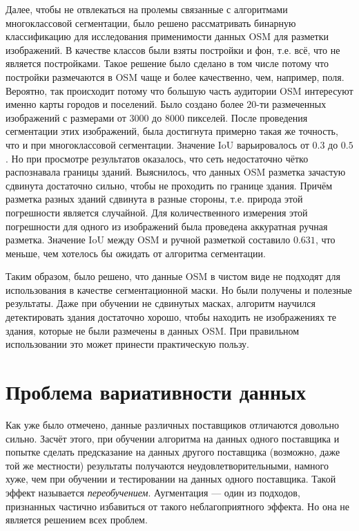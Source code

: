Далее, чтобы не отвлекаться на пролемы связанные с алгоритмами многоклассовой
сегментации, было решено рассматривать бинарную классификацию для исследования
применимости данных OSM для разметки изображений. В качестве классов были взяты
постройки и фон, т.е. всё, что не является постройками. Такое решение было
сделано в том числе потому что постройки размечаются в OSM чаще и более
качественно, чем, например, поля. Вероятно, так происходит потому что большую
часть аудитории OSM интересуют именно карты городов и поселений.
Было создано более $20$-ти размеченных изображений с размерами от $3000$ до
$8000$ пикселей. После проведения сегментации этих изображений, была достигнута
примерно такая же точность, что и при многоклассовой сегментации. Значение IoU
варьировалось от $0.3$ до $0.5$.
Но при просмотре результатов оказалось, что сеть недостаточно чётко распознавала
границы зданий. Выяснилось, что данных OSM разметка зачастую сдвинута достаточно
сильно, чтобы не проходить по границе здания. Причём разметка разных зданий
сдвинута в разные стороны, т.е. природа этой погрешности является случайной.
Для количественного измерения этой погрешности для одного из изображений была
проведена аккуратная ручная разметка. Значение IoU между OSM и ручной разметкой
составило $0.631$, что меньше, чем хотелось бы ожидать от алгоритма сегментации.

Таким образом, было решено, что данные OSM в чистом виде не подходят для
использования в качестве сегментационной маски. Но были получены и полезные
результаты. Даже при обучении не сдвинутых масках, алгоритм научился
детектировать здания достаточно хорошо, чтобы находить не изображениях те здания,
которые не были размечены в данных OSM. При правильном использовании это может
принести практическую пользу.


\section*{Проблема вариативности данных}
Как уже было отмечено, данные различных поставщиков отличаются довольно сильно.
Засчёт этого, при обучении алгоритма на данных одного поставщика и попытке
сделать предсказание на данных другого поставщика (возможно, даже той же
местности) результаты получаются неудовлетворительными, намного хуже, чем при
обучении и тестировании на данных одного поставщика. Такой эффект называется
\textit{переобучением}. Аугментация --- один из подходов, признанных частично
избавиться от такого неблагоприятного эффекта. Но она не является решением всех
проблем.

